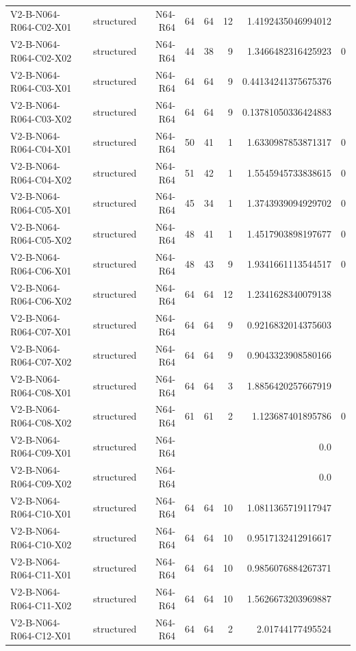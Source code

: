 {\begin{longtable}{lrrrrrrr}
V2-B-N064-R064-C02-X01 & structured & N64-R64 & 64 & 64 & 12 & 1.4192435046994012 &  \\
V2-B-N064-R064-C02-X02 & structured & N64-R64 & 44 & 38 & 9 & 1.3466482316425923 & 0 \\
V2-B-N064-R064-C03-X01 & structured & N64-R64 & 64 & 64 & 9 & 0.44134241375675376 &  \\
V2-B-N064-R064-C03-X02 & structured & N64-R64 & 64 & 64 & 9 & 0.13781050336424883 &  \\
V2-B-N064-R064-C04-X01 & structured & N64-R64 & 50 & 41 & 1 & 1.6330987853871317 & 0 \\
V2-B-N064-R064-C04-X02 & structured & N64-R64 & 51 & 42 & 1 & 1.5545945733838615 & 0 \\
V2-B-N064-R064-C05-X01 & structured & N64-R64 & 45 & 34 & 1 & 1.3743939094929702 & 0 \\
V2-B-N064-R064-C05-X02 & structured & N64-R64 & 48 & 41 & 1 & 1.4517903898197677 & 0 \\
V2-B-N064-R064-C06-X01 & structured & N64-R64 & 48 & 43 & 9 & 1.9341661113544517 & 0 \\
V2-B-N064-R064-C06-X02 & structured & N64-R64 & 64 & 64 & 12 & 1.2341628340079138 &  \\
V2-B-N064-R064-C07-X01 & structured & N64-R64 & 64 & 64 & 9 & 0.9216832014375603 &  \\
V2-B-N064-R064-C07-X02 & structured & N64-R64 & 64 & 64 & 9 & 0.9043323908580166 &  \\
V2-B-N064-R064-C08-X01 & structured & N64-R64 & 64 & 64 & 3 & 1.8856420257667919 &  \\
V2-B-N064-R064-C08-X02 & structured & N64-R64 & 61 & 61 & 2 & 1.123687401895786 & 0 \\
V2-B-N064-R064-C09-X01 & structured & N64-R64 &  &  &  & 0.0 &  \\
V2-B-N064-R064-C09-X02 & structured & N64-R64 &  &  &  & 0.0 &  \\
V2-B-N064-R064-C10-X01 & structured & N64-R64 & 64 & 64 & 10 & 1.0811365719117947 &  \\
V2-B-N064-R064-C10-X02 & structured & N64-R64 & 64 & 64 & 10 & 0.9517132412916617 &  \\
V2-B-N064-R064-C11-X01 & structured & N64-R64 & 64 & 64 & 10 & 0.9856076884267371 &  \\
V2-B-N064-R064-C11-X02 & structured & N64-R64 & 64 & 64 & 10 & 1.5626673203969887 &  \\
V2-B-N064-R064-C12-X01 & structured & N64-R64 & 64 & 64 & 2 & 2.01744177495524 &  \\

\end{longtable}}
